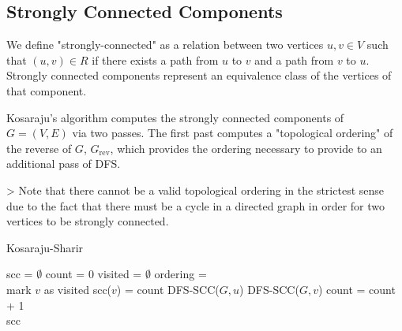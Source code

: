 \documentclass{standalone}
\begin{document}
\subsection{Strongly Connected Components}

We define "strongly-connected" as a relation between two vertices $u, v \in V$ such that $(u, v) \in R$ if there exists a path from $u$ to $v$ and a path from $v$ to $u$. Strongly connected components represent an equivalence class of the vertices of that component.

Kosaraju's algorithm computes the strongly connected components of $G = (V, E)$ via two passes. The first past computes a "topological ordering" of the reverse of $G$, $G_{\text{rev}}$, which provides the ordering necessary to provide to an additional pass of DFS.

> Note that there cannot be a valid topological ordering in the strictest sense due to the fact that there must be a cycle in a directed graph in order for two vertices to be strongly connected.

\begin{algorithm}
  \caption{Kosaraju-Sharir}
  \begin{algorithmic}
  \State scc = $\emptyset$
  \State count = 0
  \State visited = $\emptyset$
  \State ordering = 
    \State \\
  \State mark $v$ as visited
  \State scc($v$) = count
  \State DFS-SCC($G, u$)
    \EndIf
    \EndFor
    \EndFunction
    \State DFS-SCC($G, v$)
    \State count = count + 1
    \EndFor
    \State \\
    \Return scc
  \end{algorithmic}
\end{algorithm}
\end{document}
